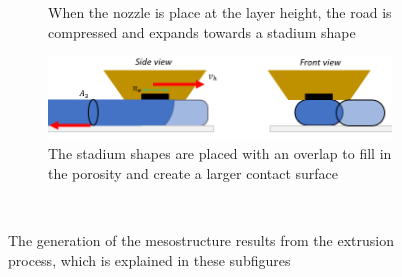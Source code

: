 \begin{figure}
\begin{subfigure}[b]{0.6\textwidth}
    \caption{When the nozzle is place at the layer height, the road is compressed and expands towards a stadium shape}
  \end{subfigure}
  \begin{subfigure}[b]{0.6\textwidth}
    \includegraphics[width=\textwidth]{appendix_a/figures/Step4.PNG}
    \caption{The stadium shapes are placed with an overlap to fill in the porosity and create a larger contact surface}
  \end{subfigure}
  \\
  \caption{The generation of the mesostructure results from the extrusion process, which is explained in these subfigures}
  \end{figure}
  
 
  

